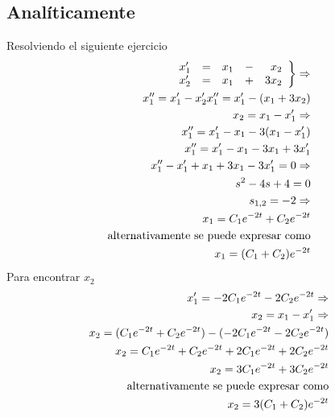 \documentclass[12pt,spanish,lettersize]{article}
\begin{document}
\subsection{Anal\'iticamente}
Resolviendo el siguiente ejercicio
\begin{eqnarray}
\left.
\begin{array}{lcrcr}
x'_1 & = & x_1 & - & x_2\\
x'_2 & = & x_1 & + & 3x_2
\end{array}
\right\} \Rightarrow\\
x''_1=x'_1-x'_2
x''_1=x'_1-(x_1+3x_2)\\
\nonumber x_2=x_1-x'_1\Rightarrow\\
x''_1=x'_1-x_1-3(x_1-x'_1)\\
x''_1=x'_1-x_1-3x_1+3x'_1\\
x''_1-x'_1+x_1+3x_1-3x'_1=0 \Rightarrow\\
\nonumber s^2-4s+4=0\\
s_{1,2}=-2\Rightarrow\\
x_1=C_1e^{-2t}+C_2e^{-2t}\\
\nonumber\textnormal{alternativamente se puede expresar como}\\
x_1=(C_1+C_2)e^{-2t}
\end{eqnarray}
Para encontrar $x_2$
\begin{eqnarray}
x'_1=-2C_1e^{-2t}-2C_2e^{-2t}\Rightarrow\\
x_2=x_1-x'_1\Rightarrow\\
x_2=(C_1e^{-2t}+C_2e^{-2t})-(-2C_1e^{-2t}-2C_2e^{-2t})\\
x_2=C_1e^{-2t}+C_2e^{-2t}+2C_1e^{-2t}+2C_2e^{-2t}\\
x_2=3C_1e^{-2t}+3C_2e^{-2t}\\
\nonumber\textnormal{alternativamente se puede expresar como}\\
x_2=3(C_1+C_2)e^{-2t}
\end{eqnarray}
\end{document}
